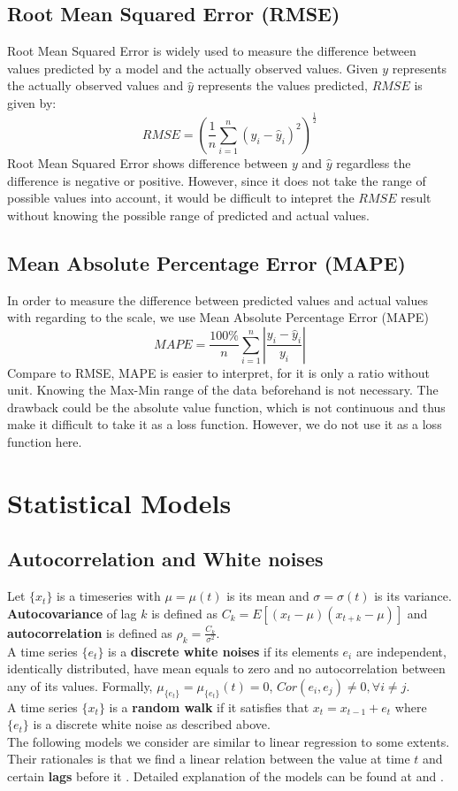 \documentclass[11pt]{article}
\begin{document}
\subsection{Root Mean Squared Error (RMSE)}
Root Mean Squared Error is widely used to measure the difference between values
predicted by a model and the actually observed values. Given $y$ represents the
actually observed values and $\hat{y}$ represents the values predicted, $RMSE$
is given by:
$$
RMSE = \left( \frac{1}{n}\sum _{i=1}^{n}(y_i -\hat{y}_i)^2 \right)^\frac{1}{2}
$$
Root Mean Squared Error shows difference between $y$ and $\hat{y}$ regardless
the difference is negative or positive. However, since it does not take the
range of possible values into account, it would be difficult to intepret the
$RMSE$ result without knowing the possible range of predicted and actual values.

\subsection{Mean Absolute Percentage Error (MAPE)}
In order to measure the difference between predicted values and actual values
with regarding to the scale, we use Mean Absolute Percentage Error (MAPE)
$$
MAPE = \frac{100\%}{n}\sum  _{i=1}^{n}\left| \frac{y_i -\hat{y}_i}{y_i} \right|
$$
Compare to RMSE, MAPE is easier to interpret, for it is only a ratio without
unit. Knowing the Max-Min range of the data beforehand is not necessary. The
drawback could be the absolute value function, which is not continuous and thus
make it difficult to take it as a loss function. However, we do not use it as a
loss function here.

\section{Statistical Models}
\subsection{Autocorrelation and White noises}
Let $\{x_t\}$ is a timeseries with $\mu=\mu(t)$ is its mean and
$\sigma=\sigma(t)$ is its variance. \textbf{Autocovariance} of lag $k$ is
defined as $C_k=E[(x_t-\mu)(x_{t+k}-\mu)]$ and \textbf{autocorrelation} is
defined
as $\rho_k=\frac{C_k}{\sigma^2}$.\\
A time series $\{e_t\}$ is a \textbf{discrete white noises} if its elements
$e_i$ are independent, identically distributed, have mean equals to zero and no
autocorrelation between any of its values. Formally,
$\mu_{\{e_t\}}=\mu_{\{e_t\}}(t)=0$,
$Cor(e_i,e_j)\neq 0, \forall i \neq j$.\\
A time series $\{x_t\}$ is a \textbf{random walk} if it satisfies that
$x_t=x_{t-1}+e_t$ where $\{e_t\}$ is a discrete white noise as described above.\\
The following models we consider are similar to linear regression to some
extents. Their rationales is that we find a linear relation between the
value at time $t$ and certain \textbf{lags} before it . Detailed explanation of
the models can be found at \cite{GVK483463442} and \cite{quantstart}.
\end{document}
